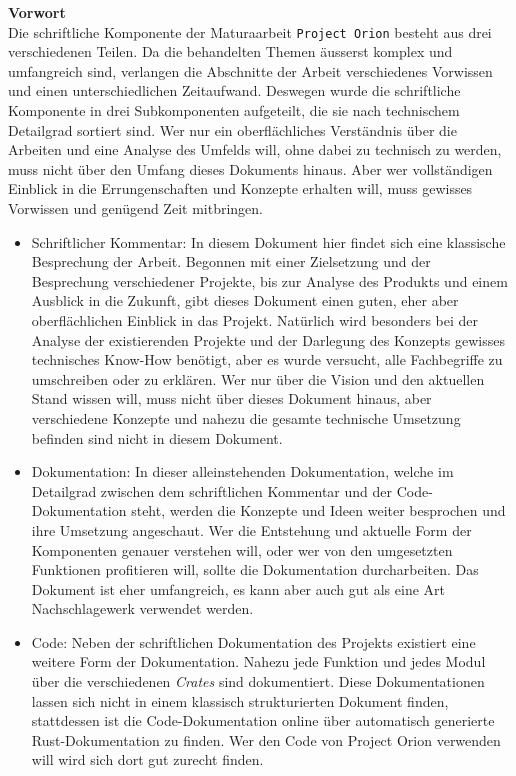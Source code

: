 \documentclass[11pt]{article}
\begin{document}
\textbf{Vorwort}\\
Die schriftliche Komponente der Maturaarbeit \texttt{Project Orion} besteht aus
drei verschiedenen Teilen. Da die behandelten Themen äusserst komplex
und umfangreich sind, verlangen die Abschnitte der Arbeit
verschiedenes Vorwissen und einen unterschiedlichen Zeitaufwand.
Deswegen wurde die schriftliche Komponente in drei Subkomponenten
aufgeteilt, die sie nach technischem Detailgrad sortiert sind. Wer nur
ein oberflächliches Verständnis über die Arbeiten und eine Analyse des
Umfelds will, ohne dabei zu technisch zu werden, muss nicht über den
Umfang dieses Dokuments hinaus. Aber wer vollständigen Einblick in die
Errungenschaften und Konzepte erhalten will, muss gewisses Vorwissen
und genügend Zeit mitbringen.
\begin{itemize}
\item Schriftlicher Kommentar: In diesem Dokument hier findet sich eine
klassische Besprechung der Arbeit. Begonnen mit einer Zielsetzung
und der Besprechung verschiedener Projekte, bis zur Analyse des
Produkts und einem Ausblick in die Zukunft, gibt dieses Dokument
einen guten, eher aber oberflächlichen Einblick in das Projekt.
Natürlich wird besonders bei der Analyse der existierenden Projekte
und der Darlegung des Konzepts gewisses technisches Know-How
benötigt, aber es wurde versucht, alle Fachbegriffe zu umschreiben
oder zu erklären. Wer nur über die Vision und den aktuellen Stand
wissen will, muss nicht über dieses Dokument hinaus, aber
verschiedene Konzepte und nahezu die gesamte technische Umsetzung
befinden sind nicht in diesem Dokument.
\item Dokumentation: In dieser alleinstehenden Dokumentation, welche im
Detailgrad zwischen dem schriftlichen Kommentar und der
Code-Dokumentation steht, werden die Konzepte und Ideen weiter
besprochen und ihre Umsetzung angeschaut. Wer die Entstehung und
aktuelle Form der Komponenten genauer verstehen will, oder wer von
den umgesetzten Funktionen profitieren will, sollte die
Dokumentation durcharbeiten. Das Dokument ist eher umfangreich, es
kann aber auch gut als eine Art Nachschlagewerk verwendet werden.
\item Code: Neben der schriftlichen Dokumentation des Projekts existiert
eine weitere Form der Dokumentation. Nahezu jede Funktion und jedes
Modul über die verschiedenen \emph{Crates} sind dokumentiert. Diese
Dokumentationen lassen sich nicht in einem klassisch strukturierten
Dokument finden, stattdessen ist die Code-Dokumentation online über
automatisch generierte Rust-Dokumentation zu finden. Wer den Code
von Project Orion verwenden will wird sich dort gut zurecht finden.
\end{itemize}
\newpage
\end{document}
